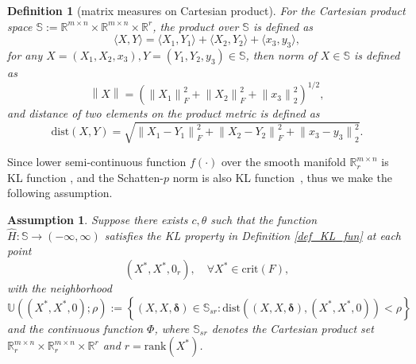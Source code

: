 \documentclass[twoside,11pt]{article}
\newtheorem{Def}{Definition}
\newtheorem{ASM}{Assumption}
\numberwithin{equation}{section}
\begin{document}
 \begin{Def}[matrix measures on Cartesian product]\label{def_product} For the Cartesian product space $\mathbb{S}:=\mathbb{R}^{m\times n} \times \mathbb{R}^{m\times n}\times \mathbb{R}^{r} $, the product over $\mathbb{S}$ is defined as
   \begin{equation*}
     \langle X,Y \rangle = \langle X_{1},Y_{1} \rangle + \langle X_{2},Y_{2} \rangle + \langle x_{3}, y_{3} \rangle,
   \end{equation*}
   for any $X= (X_{1},X_{2},x_{3}),Y= (Y_{1},Y_{2},y_{3})\in\mathbb{S} $, then  norm of $X\in\mathbb{S} $ is defined as 
   \begin{equation*} 
     {\left\|X\right\|}  =  ({\|X_{1}\|}^{2}_{F} +{\|X_{2}\|}^{2}_{F}+ {\|x_{3}\|}^{2}_{2})^{1/2}, 
   \end{equation*}
   and distance of two elements on the product metric  is defined as 
   \begin{equation*} 
        \mathrm{dist} \left(X,Y\right)  = \sqrt{{\|X_{1}-Y_{1}\|}^{2}_{F} +{\|X_{2}-Y_{2}\|}^{2}_{F}+ {\|x_{3}-y_{3}\|}^{2}_{2} }.
   \end{equation*}
 \end{Def}
 





 Since lower semi-continuous function $f (\cdot) $ over the smooth manifold $\mathbb{R}_{r}^{m\times{n}}$ is KL function \cite{KL_semi_algebraic}, and the Schatten-$p$ norm is also KL function~\cite{KL_p_norm}, thus we make the following assumption.

 \begin{ASM}\label{ASM_KL_acc}
   Suppose there exists $c, \theta$ such that the function $\hat{H}:\mathbb{S}\to (-\infty,\infty) $ satisfies the KL property 
   in Definition \ref{def_KL_fun} at each point
   \begin{equation}
       (X^{*},X^{*},0_{r}),\quad \forall X^{*}\in\mathrm{crit} (F),
   \end{equation}
   with the neighborhood  
   \begin{equation*}
     \mathbb{U} ( (X^{*},X^{*},0);\rho):=\left\{ (X,X, {\bm{\delta}})\in\mathbb{S}_{sr}:\mathrm{dist} ( (X,X,\bm{\delta}), (X^{*},X^{*},0))<\rho \right\}
   \end{equation*} 
     and the continuous  function $\Phi $, where $\mathbb{S}_{sr} $ denotes the Cartesian product set $\mathbb{R}_{r}^{m\times n}\times\mathbb{R}_{r}^{m\times n}\times\mathbb{R}^{r} $ and $r=\mathrm{rank} (X^{*}) $.
 \end{ASM}
 
\end{document}
